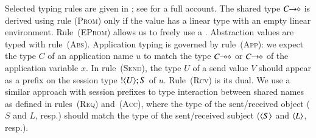 \documentclass[runningheads]{llncs}
\begin{document}
Selected typing rules are given in ; 
see \cite{KouzapasPY15} for a full account.
The shared type $C\!\! \rightarrow\!\! \diamond$ %
is derived using rule \textsc{(Prom)} only  
if the value has a linear type with an empty linear
environment.
Rule~\textsc{(EProm)} allows us to freely use a .
%
Abstraction values are typed with rule~\textsc{(Abs)}.
Application typing
is governed by rule~\textsc{(App)}: we expect
the type $C$ of an application name $u$ 
to match the type $C\!\! \multimap\!\! \diamond$ or $C\!\! \rightarrow\!\! \diamond$
of the application variable $x$.
%
In rule~\textsc{(Send)}, 
the type $U$ of a send value $V$ should appear as a prefix
on the session type $! \langle U \rangle ; S$ of $u$.
Rule~\textsc{(Rcv)} is its dual.  
We use a similar approach with session prefixes
to type interaction between shared names as defined 
in rules~\textsc{(Req)} and~\textsc{(Acc)},
where the type of the sent/received object 
($S$ and $L$, resp.) should
match the type of the sent/received subject
($\langle S \rangle$ and $\langle L \rangle$, resp.).
\end{document}
